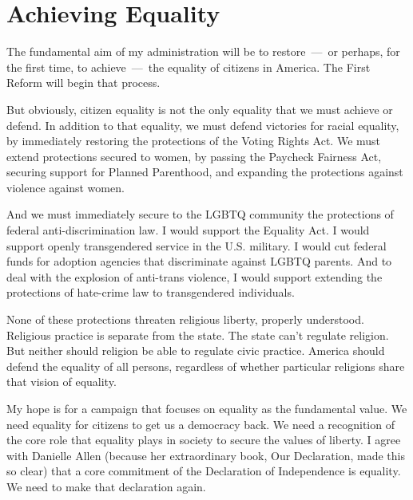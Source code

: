 \section{Achieving Equality}

The fundamental aim of my administration will be to restore~---~or perhaps, for the first time, to achieve~---~the equality of citizens in America. The First Reform will begin that process.

But obviously, citizen equality is not the only equality that we must achieve or defend. In addition to that equality, we must defend victories for racial equality, by immediately restoring the protections of the Voting Rights Act. We must extend protections secured to women, by passing the Paycheck Fairness Act, securing support for Planned Parenthood, and expanding the protections against violence against women.

And we must immediately secure to the LGBTQ community the protections of federal anti-discrimination law. I would support the Equality Act. I would support openly transgendered service in the U.S. military. I would cut federal funds for adoption agencies that discriminate against LGBTQ parents. And to deal with the explosion of anti-trans violence, I would support extending the protections of hate-crime law to transgendered individuals.

None of these protections threaten religious liberty, properly understood. Religious practice is separate from the state. The state can't regulate religion. But neither should religion be able to regulate civic practice. America should defend the equality of all persons, regardless of whether particular religions share that vision of equality.

My hope is for a campaign that focuses on equality as the fundamental value. We need equality for citizens to get us a democracy back. We need a recognition of the core role that equality plays in society to secure the values of liberty. I agree with Danielle Allen (because her extraordinary book, Our Declaration, made this so clear) that a core commitment of the Declaration of Independence is equality. We need to make that declaration again.
